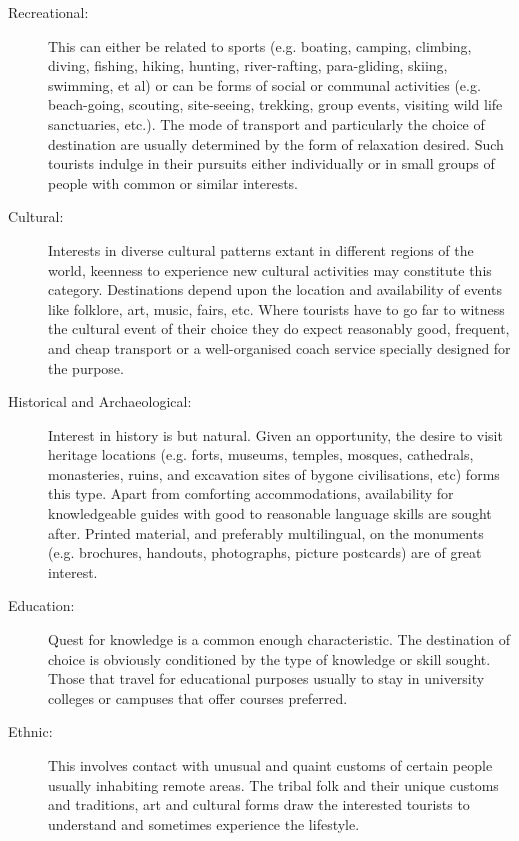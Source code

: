 \begin{description}
  \item[Recreational:] This can either be related to sports (e.g. boating, camping, climbing, diving, fishing, hiking, hunting, river-rafting, para-gliding, skiing, swimming, et al) or can be forms of social or communal activities (e.g. beach-going, scouting, site-seeing, trekking, group events, visiting wild life sanctuaries, etc.). The mode of transport and particularly the choice of destination are usually determined by the form of relaxation desired. Such tourists indulge in their pursuits either individually or in small groups of people with common or similar interests.

  \item[Cultural:] Interests in diverse cultural patterns extant in different regions of the world, keenness to experience new cultural activities may constitute this category. Destinations depend upon the location and availability of events like folklore, art, music, fairs, etc. Where tourists have to go far to witness the cultural event of their choice they do expect reasonably good, frequent, and cheap transport or a well-organised coach service specially designed for the purpose.

  \item[Historical and Archaeological:] Interest in history is but natural. Given an opportunity, the desire to visit heritage locations (e.g. forts, museums, temples, mosques, cathedrals, monasteries, ruins, and excavation sites of bygone civilisations, etc) forms this type. Apart from comforting accommodations, availability for knowledgeable guides with good to reasonable language skills are sought after. Printed material, and preferably multilingual, on the monuments (e.g. brochures, handouts, photographs, picture postcards) are of great interest.

  \item[Education:] Quest for knowledge is a common enough characteristic. The destination of choice is obviously conditioned by the type of knowledge or skill sought. Those that travel for educational purposes usually to stay in university colleges or campuses that offer courses preferred.

  \item[Ethnic:] This involves contact with unusual and quaint customs of certain people usually inhabiting remote areas. The tribal folk and their unique customs and traditions, art and cultural forms draw the interested tourists to understand and sometimes experience the lifestyle.


\end{description}
